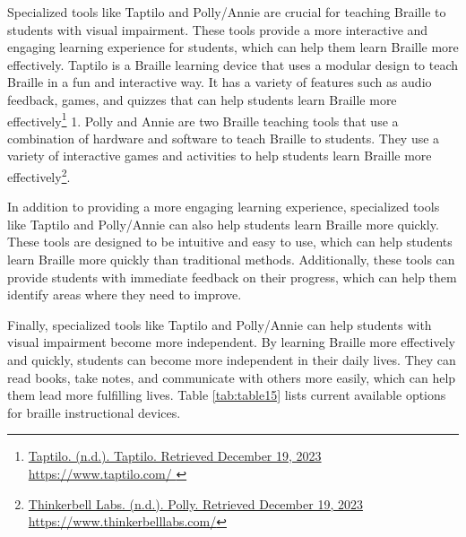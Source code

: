\documentclass[12pt,letterpaper,twoside]{extreport}
\begin{document}
Specialized tools like Taptilo and Polly/Annie are crucial for teaching Braille to students with visual impairment. These tools provide a more interactive and engaging learning experience for students, which can help them learn Braille more effectively. Taptilo is a Braille learning device that uses a modular design to teach Braille in a fun and interactive way. It has a variety of features such as audio feedback, games, and quizzes that can help students learn Braille more effectively\footnote{\raggedright \href{https://www.taptilo.com/ }{Taptilo. (n.d.). Taptilo. Retrieved December 19, 2023} \url{https://www.taptilo.com/ }} 1. Polly and Annie are two Braille teaching tools that use a combination of hardware and software to teach Braille to students. They use a variety of interactive games and activities to help students learn Braille more effectively\footnote{\raggedright \href{https://www.thinkerbelllabs.com/}{Thinkerbell Labs. (n.d.). Polly. Retrieved December 19, 2023} \url{https://www.thinkerbelllabs.com/}}.

In addition to providing a more engaging learning experience, specialized tools like Taptilo and Polly/Annie can also help students learn Braille more quickly. These tools are designed to be intuitive and easy to use, which can help students learn Braille more quickly than traditional methods. Additionally, these tools can provide students with immediate feedback on their progress, which can help them identify areas where they need to improve.

Finally, specialized tools like Taptilo and Polly/Annie can help students with visual impairment become more independent. By learning Braille more effectively and quickly, students can become more independent in their daily lives. They can read books, take notes, and communicate with others more easily, which can help them lead more fulfilling lives.
Table \ref{tab:table15} lists current available options for braille instructional devices.
\end{document}
